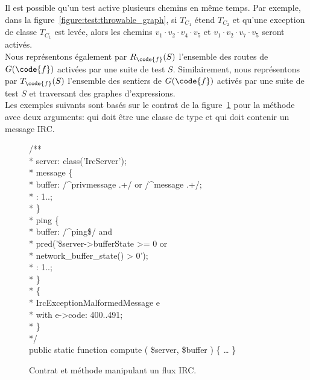 Il est possible qu'un test active plusieurs chemins en même temps. Par exemple,
dans la figure~\ref{figure:test:throwable_graph}, si $T_{C_1}$ étend $T_{C_2}$
et qu'une exception de classe $T_{C_1}$ est levée, alors les chemins $v_1 \cdot
v_2 \cdot v_4 \cdot v_5$ et $v_1 \cdot v_2 \cdot v_7 \cdot v_5$ seront activés.
\\

Nous représentons également par $R_\code{f}(S)$ l'ensemble des routes de
$G(\code{f})$ activées par une suite de test $S$. Similairement, nous
représentons par $T_\code{f}(S)$ l'ensemble des sentiers de $G(\code{f})$
activés par une suite de test $S$ et traversant des graphes d'expressions. \\

Les exemples suivants sont basés sur le contrat de la
figure~\ref{figure:test:irc} pour la méthode  avec deux arguments:
 qui doit être une classe de type
 et  qui doit contenir un message
IRC.
%
\begin{figure}

\begin{bigpre}
/** \\
 * \arequires server: class('\bslash{}Irc\bslash{}Server'); \\
 * \abehavior message \{ \\
 *     \arequires buffer: /^privmessage .+/ or /^message .+/; \\
 *     \aensures  \aresult: 1..; \\
 * \} \\
 * \abehavior ping \{ \\
 *     \arequires buffer: /^ping\$/ and \\
 *               \bslash{}pred('\$server->bufferState   >= 0 or \\
 *                      network\_buffer\_state() >  0'); \\
 *     \aensures  \aresult: 1..; \\
 * \} \\
 * \adefault \{ \\
 *     \athrowable \bslash{}Irc\bslash{}Exception\bslash{}MalformedMessage e \\
 *                    with e->code: 400..491; \\
 * \} \\
 */ \\
public static function compute ( \$server, \$buffer ) \{ … \}
\end{bigpre}

\caption{\label{figure:test:irc} Contrat et méthode manipulant un flux IRC.}

\end{figure}
